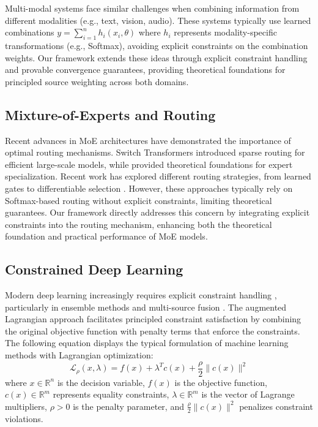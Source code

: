 \documentclass[preprint,12pt,authoryear]{elsarticle}
\begin{document}
Multi-modal systems \cite{alayrac2022flamingo} face similar challenges when combining information from different modalities (e.g., text, vision, audio). These systems typically use learned combinations $y = \sum_{i=1}^n h_i(x_i, \theta)$ where $h_i$ represents modality-specific transformations (e.g., Softmax), avoiding explicit constraints on the combination weights. Our framework extends these ideas through explicit constraint handling and provable convergence guarantees, providing theoretical foundations for principled source weighting across both domains.



\subsection{Mixture-of-Experts and Routing}
Recent advances in MoE architectures have demonstrated the importance of optimal routing mechanisms. Switch Transformers \cite{fedus2022switch} introduced sparse routing for efficient large-scale models, while \cite{zhou2022mixture} provided theoretical foundations for expert specialization. Recent work has explored different routing strategies, from learned gates \cite{shazeer2022glu} to differentiable selection \cite{hazimeh2021dselect}. However, these approaches typically rely on Softmax-based routing without explicit constraints, limiting theoretical guarantees. Our framework directly addresses this concern by integrating explicit constraints into the routing mechanism, enhancing both the theoretical foundation and practical performance of MoE models.


\subsection{Constrained Deep Learning}
Modern deep learning increasingly requires explicit constraint handling \cite{liu2023survey, zhao2023constrained}, particularly in ensemble methods \cite{wen2023optimal} and multi-source fusion \cite{chen2022robust}. The augmented Lagrangian approach facilitates principled constraint satisfaction by combining the original objective function with penalty terms that enforce the constraints. The following equation displays the typical formulation of machine learning methods with Lagrangian optimization:
\begin{equation}
    \mathcal{L}_\rho(x, \lambda) = f(x) + \lambda^Tc(x) + \frac{\rho}{2}\|c(x)\|^2
\end{equation}
where \( x \in \mathbb{R}^n \) is the decision variable, \( f(x) \) is the objective function, \( c(x) \in \mathbb{R}^m \) represents equality constraints, \( \lambda \in \mathbb{R}^m \) is the vector of Lagrange multipliers, \( \rho > 0 \) is the penalty parameter, and \( \frac{\rho}{2} \|c(x)\|^2 \) penalizes constraint violations.
\end{document}
